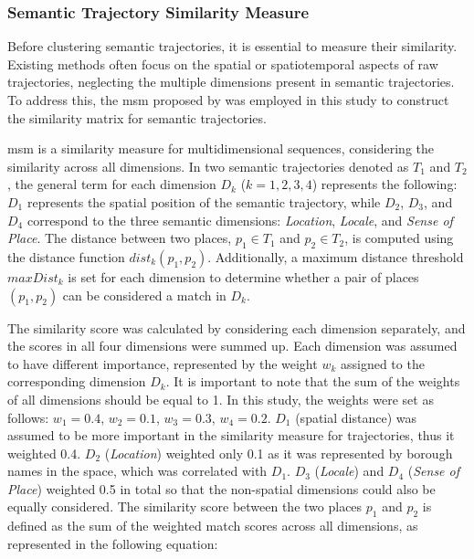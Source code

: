 \documentclass{article}
\theoremstyle{definition}
\theoremstyle{remark}
\begin{document}
\subsubsection{Semantic Trajectory Similarity Measure} \label{traj_similarity}
Before clustering semantic trajectories, it is essential to measure their similarity. Existing methods often focus on the spatial or spatiotemporal aspects of raw trajectories, neglecting the multiple dimensions present in semantic trajectories. To address this, the \acrfull{msm} proposed by \cite{furtado_multidimensional_2016} was employed in this study to construct the similarity matrix for semantic trajectories. 

\acrshort{msm} is a similarity measure for multidimensional sequences, considering the similarity across all dimensions. In two semantic trajectories denoted as $T_{1}$ and $T_{2}$, the general term for each dimension $D_{k}$ ($k = 1, 2, 3, 4$) represents the following: $D_{1}$ represents the spatial position of the semantic trajectory, while $D_{2}$, $D_{3}$, and $D_{4}$ correspond to the three semantic dimensions: \textit{Location}, \textit{Locale}, and \textit{Sense of Place}. The distance between two places, $p_{1} \in T_{1}$ and $p_{2} \in T_{2}$, is computed using the distance function $dist_{k}(p_{1},p_{2})$. Additionally, a maximum distance threshold $maxDist_{k}$ is set for each dimension to determine whether a pair of places $(p_{1},p_{2})$ can be considered a match in $D_{k}$.

The similarity score was calculated by considering each dimension separately, and the scores in all four dimensions were summed up. Each dimension was assumed to have different importance, represented by the weight $w_{k}$ assigned to the corresponding dimension $D_{k}$. It is important to note that the sum of the weights of all dimensions should be equal to 1. In this study, the weights were set as follows: $w_{1}=0.4$, $w_{2}=0.1$, $w_{3}=0.3$, $w_{4}=0.2$. $D_{1}$ (spatial distance) was assumed to be more important in the similarity measure for trajectories, thus it weighted 0.4. $D_{2}$ (\textit{Location}) weighted only 0.1 as it was represented by borough names in the space, which was correlated with $D_{1}$. $D_{3}$ (\textit{Locale}) and $D_{4}$ (\textit{Sense of Place}) weighted 0.5 in total so that the non-spatial dimensions could also be equally considered. The similarity score between the two places $p_{1}$ and $p_{2}$ is defined as the sum of the weighted match scores across all dimensions, as represented in the following equation:
\end{document}
